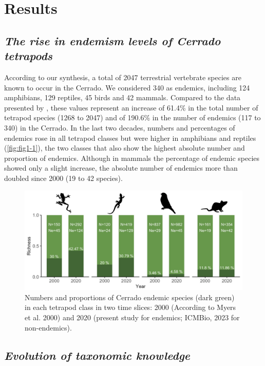 \documentclass[12pt,openright,oneside,a4paper,english]{abntex2}
\begin{document}
\section{Results}
\subsection{\textit{The rise in endemism levels of Cerrado tetrapods}}

According to our synthesis, a total of 2047 terrestrial vertebrate species are known to occur in the Cerrado. We considered 340 as endemics, including 124 amphibians, 129 reptiles, 45 birds and 42 mammals. Compared to the data presented by \citet{Myers2000}, these values represent an increase of 61.4\% in the total number of tetrapod species (1268 to 2047) and of 190.6\% in the number of endemics (117 to 340) in the Cerrado. In the last two decades, numbers and percentages of endemics rose in all tetrapod classes but were higher in amphibians and reptiles (\autoref{fig:fig1-1}), the two classes that also show the highest absolute number and proportion of endemics. Although in mammals the percentage of endemic species showed only a slight increase, the absolute number of endemics more than doubled since 2000 (19 to 42 species).

\begin{figure}[htb]
	\centering
	\includegraphics[width=160mm]{Fig c1-1}
	\caption[Rise in endemism levels of Cerrado tetrapods]{\small Numbers and proportions of Cerrado endemic species (dark green) in each tetrapod class in two time slices: 2000 (According to Myers et al. 2000) and 2020 (present study for endemics; ICMBio, 2023 for non-endemics).}
	\label{fig:fig1-1}
\end{figure}

\subsection{\textit{Evolution of taxonomic knowledge}}
\end{document}
